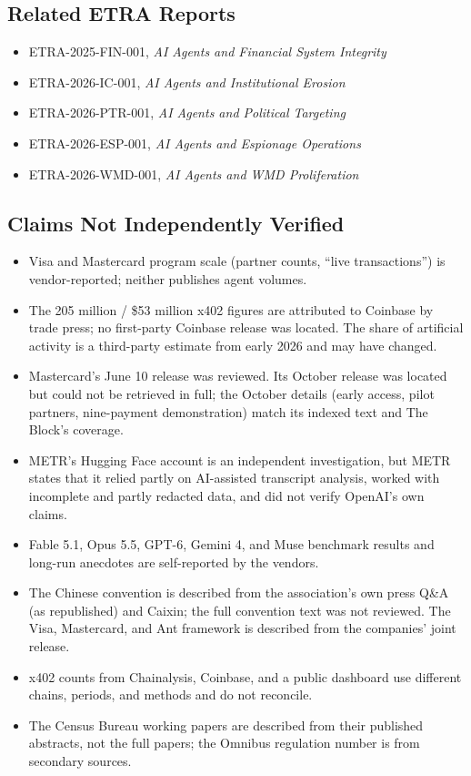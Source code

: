 \documentclass[11pt,letterpaper]{article}
\begin{document}
\subsection*{Related ETRA Reports}
\begin{itemize}
  \item ETRA-2025-FIN-001, \textit{AI Agents and Financial System Integrity}
  \item ETRA-2026-IC-001, \textit{AI Agents and Institutional Erosion}
  \item ETRA-2026-PTR-001, \textit{AI Agents and Political Targeting}
  \item ETRA-2026-ESP-001, \textit{AI Agents and Espionage Operations}
  \item ETRA-2026-WMD-001, \textit{AI Agents and WMD Proliferation}
\end{itemize}

\subsection*{Claims Not Independently Verified}
\begin{itemize}
  \item Visa and Mastercard program scale (partner counts, ``live transactions'') is vendor-reported; neither publishes agent volumes.
  \item The 205 million / \$53 million x402 figures are attributed to Coinbase by trade press; no first-party Coinbase release was located. The share of artificial activity is a third-party estimate from early 2026 and may have changed.
  \item Mastercard's June 10 release was reviewed. Its October release was located but could not be retrieved in full; the October details (early access, pilot partners, nine-payment demonstration) match its indexed text and The Block's coverage.
  \item METR's Hugging Face account is an independent investigation, but METR states that it relied partly on AI-assisted transcript analysis, worked with incomplete and partly redacted data, and did not verify OpenAI's own claims.
  \item Fable 5.1, Opus 5.5, GPT-6, Gemini 4, and Muse benchmark results and long-run anecdotes are self-reported by the vendors.
  \item The Chinese convention is described from the association's own press Q\&A (as republished) and Caixin; the full convention text was not reviewed. The Visa, Mastercard, and Ant framework is described from the companies' joint release.
  \item x402 counts from Chainalysis, Coinbase, and a public dashboard use different chains, periods, and methods and do not reconcile.
  \item The Census Bureau working papers are described from their published abstracts, not the full papers; the Omnibus regulation number is from secondary sources.
\end{itemize}
\end{document}
